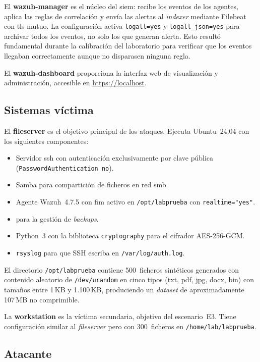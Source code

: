 \documentclass[../main.tex]{subfiles}
\begin{document}
El \textbf{wazuh-manager} es el núcleo del \gls{siem}: recibe los eventos de los
agentes, aplica las reglas de correlación y envía las alertas al \emph{indexer}
mediante Filebeat con \gls{tls} mutuo. La configuración activa \texttt{logall=yes}
y \texttt{logall\_json=yes} para archivar todos los eventos, no solo los que generan
alerta. Esto resultó fundamental durante la calibración del laboratorio para
verificar que los eventos llegaban correctamente aunque no disparasen ninguna regla.

El \textbf{wazuh-dashboard} proporciona la interfaz web de visualización y
administración, accesible en \url{https://localhost}.

\subsection{Sistemas víctima}

El \textbf{fileserver} es el objetivo principal de los ataques. Ejecuta Ubuntu~24.04
con los siguientes componentes:

\begin{itemize}
  \item Servidor \gls{ssh} con autenticación exclusivamente por clave pública
  (\texttt{PasswordAuthentication no}).
  \item Samba para compartición de ficheros en red \gls{smb}.
  \item Agente Wazuh~4.7.5 con \gls{fim} activo en \texttt{/opt/labprueba}
  con \texttt{realtime="yes"}.
  \item \restic para la gestión de \emph{backups}.
  \item Python~3 con la biblioteca \texttt{cryptography} para el cifrador AES-256-GCM.
  \item \texttt{rsyslog} para que SSH escriba en \texttt{/var/log/auth.log}.
\end{itemize}

El directorio \texttt{/opt/labprueba} contiene 500~ficheros sintéticos generados
con contenido aleatorio de \texttt{/dev/urandom} en cinco tipos (txt, pdf, jpg,
docx, bin) con tamaños entre 1\,KB y 1.100\,KB, produciendo un \emph{dataset} de
aproximadamente 107\,MB no comprimible.

La \textbf{workstation} es la víctima secundaria, objetivo del escenario~E3. Tiene
configuración similar al \emph{fileserver} pero con 300~ficheros en
\texttt{/home/lab/labprueba}.

\subsection{Atacante}
\end{document}
